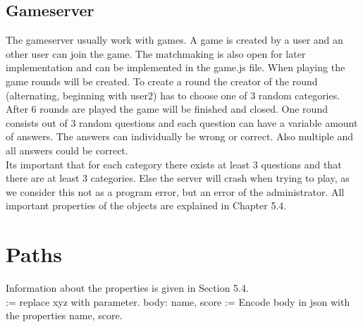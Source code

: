 \subsection{Gameserver}
The gameserver usually work with games. A game is created by a user and an other user can join the game. The matchmaking is also open for later implementation and can be implemented in the game.js file. 
When playing the game rounds will be created. To create a round the creator of the round (alternating, beginning with user2) has to choose one of 3 random categories. After 6 rounds are played the game will be finished and closed. One round consists out of 3 random questions and each question can have a variable amount of answers. The answers can individually be wrong or correct. Also multiple and all answers could be correct.\\
Its important that for each category there exists at least 3 questions and that there are at least 3 categories. Else the server will crash when trying to play, as we consider this not as a program error, but an error of the administrator. All important properties of the objects are explained in Chapter 5.4.

\newpage
\section {Paths}
Information about the properties is given in Section 5.4.\\
[xyz] := replace xyz with parameter.
body: name, score := Encode body in json with the properties name, score.\\


